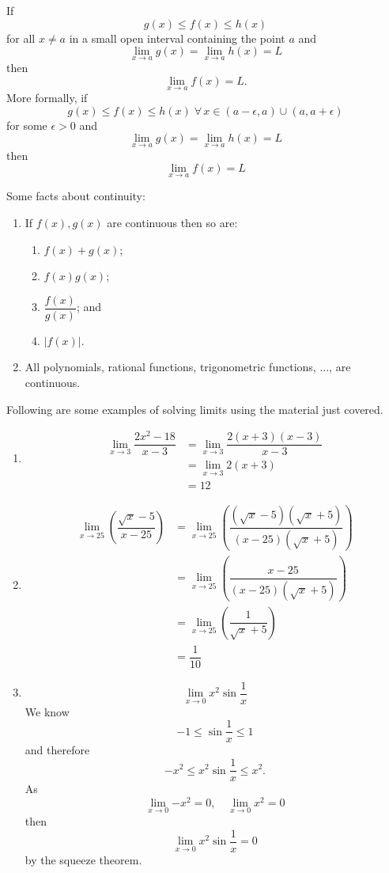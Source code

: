 \begin{theorem}
    If \[g(x)\leq f(x)\leq h(x)\] for all $x\neq a$ in a small open interval containing the point $a$ and \[\lim_{x\to a}g(x)=\lim_{x\to a}h(x)=L\] then \[\lim_{x\to a}f(x)=L.\] More formally, if \[g(x)\leq f(x)\leq h(x)\;\forall\, x\in(a-\epsilon,a)\cup(a,a+\epsilon)\] for some $\epsilon>0$ and \[\lim_{x\to a}{g(x)}=\lim_{x\to a}{h(x)}=L\] then \[\lim_{x\to a}{f(x)}=L\]
\end{theorem}

Some facts about continuity:

\begin{enumerate}
    \item If $f(x),g(x)$ are continuous then so are:
    \begin{enumerate}
        \item $f(x)+g(x)$;
        \item $f(x)g(x)$;
        \item $\dfrac{f(x)}{g(x)}$; and
        \item $|f(x)|$.
    \end{enumerate}
    \item All polynomials, rational functions, trigonometric functions, $\ldots$, are continuous.
\end{enumerate}

\begin{example}
    Following are some examples of solving limits using the material just covered.
    \begin{enumerate}
        \item 
        \begin{align*}
            \lim_{x\to 3}\dfrac{2x^2-18}{x-3}&=\lim_{x\to 3}\dfrac{2(x+3)(x-3)}{x-3}\\
            &=\lim_{x\to 3}{2(x+3)}\\
            &=12
        \end{align*}
        
        \item
        \begin{align*}
            \lim_{x\to 25}\left(\dfrac{\sqrt x-5}{x-25}\right)&=\lim_{x\to 25}\left(\dfrac{(\sqrt x-5)(\sqrt x+5)}{(x-25)(\sqrt x+5)}\right)\\
            &=\lim_{x\to 25}\left(\dfrac{x-25}{(x-25)(\sqrt x+5)}\right)\\
            &=\lim_{x\to 25}\left(\dfrac1{\sqrt x+5}\right)\\
            &=\dfrac1{10}
        \end{align*}
        
        \item \[\lim_{x\to0}x^2\sin{\dfrac1x}\]
        We know \[-1\leq\sin{\dfrac1x}\leq1\] and therefore \[-x^2\leq x^2\sin{\dfrac1x}\leq x^2.\] As \[\lim_{x\to0}{-x^2}=0,\quad\lim_{x\to0}{x^2}=0\] then \[\lim_{x\to0}{x^2\sin{\dfrac1x}}=0\] by the squeeze theorem.
    \end{enumerate}
\end{example}

